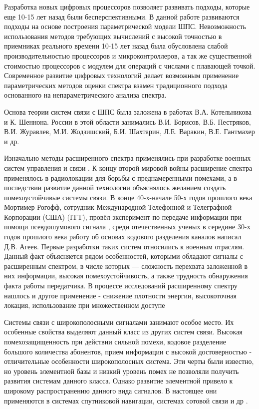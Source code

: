 Разработка новых цифровых процессоров позволяет развивать подходы, которые еще 10-15 лет назад были бесперспективными.
В данной работе развиваются подходы на основе построения параметрической модели ШПС. Невозможность использования
методов требующих вычислений с высокой точностью в приемниках реального времени
10-15 лет назад была обусловлена слабой производительностью процессоров и микроконтроллеров, а так же существенной
стоимостью процессоров с модулем для операций с числами с плавающей точкой. Современное развитие цифровых технологий делает 
возможным применение параметрических методов оценки спектра взамен традиционного подхода основанного на непараметрического
анализа спектра.

Основа теории систем связи с ШПС была заложена в работах В.А. Котельникова и К. Шеннона.
России в этой области занимались В.И. Борисов, В.Б. Пестряков, В.И. Журавлев, М.И. Жодзишский, Б.И. Шахтарин, Л.Е.  Варакин, В.Е. Гантмахер и др.

Изначально методы расширенного спектра применялись при разработке военных систем управления и связи \cite{sklyar}.
К концу второй мировой войны расширение спектра применялось в радиолокации для борьбы с преднамеренными помехами, а
в последствии развитие данной технологии объяснялось желанием создать помехоустойчивые системы связи.
В конце 40-х-начале 50-х годов прошлого века Мортимер Рогофф, сотрудник Международной Телефонной и Телеграфной Корпорации (США) (ITT),
провёл эксперимент по передаче информации при помощи псевдошумового сигнала \cite{sklyar}, среди отечественных ученых
в середине 30-х годов прошлого века работу об основах кодового разделения каналов написал Д.В. Агеев.
Первые разработки таких систем относились к военным отраслям. Данный факт объясняется рядом особенностей, которыми обладают
сигналы с расширенным спектром, в числе которых — сложность перехвата заложенной в них информации,
высокая помехоустойчивость, а также трудность обнаружения факта работы передатчика. В процессе исследований расширенному спектру
нашлось и другое применение - снижение плотности энергии, высокоточная локация, использование при множественном доступе
\cite{sklyar}

Системы связи с широкополосными сигналами занимают особое место. Их особенные свойства выделяют данный класс из других систем
связи. Высокая помехозащищенность при действии сильной помехи, кодовое разделение большого количества абонентов, прием
информации с высокой достоверностью - отличительные особенности широкополосных система. Эти черты были известно, но
уровень элементной базы и низкий уровень помех не позволяли получить развития системам данного класса. Однако развитие
элементной привело к широкому распространению данного вида сигналов. В настоящее они применяются в системах спутниковой навигации,
системах сотовой связи и др \cite{varakin-book}.

